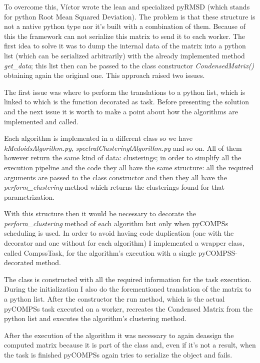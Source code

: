 To overcome this, Víctor wrote the lean and specialized pyRMSD (which stands for python Root Mean Squared Deviation). The problem is that these structure is not a native python type nor it's built with a combination of them. Because of this the framework can not serialize this matrix to send it to each worker. The first idea to solve it was to dump the internal data of the matrix into a python list (which can be serialized arbitrarily) with the already implemented method \textit{get\_data}; this list then can be passed to the class constructor \textit{CondensedMatrix()} obtaining again the original one. This approach raised two issues. 

The first issue was where to perform the translations to a python list, which is linked to which is the function decorated as task. Before presenting the solution and the next issue it is worth to make a point about how the algorithms are implemented and called. 

Each algorithm is implemented in a different class so we have \textit{kMedoidsAlgorithm.py}, \textit{spectralClusteringlAlgorithm.py} and so on. All of them however return the same kind of data: clusterings; in order to simplify all the execution pipeline and the code they all have the same structure: all the required arguments are passed to the class constructor and then they all have the \textit{perform\_clustering} method which returns the clusterings found for that parametrization. 

With this structure then it would be necessary to decorate the \textit{perform\_clustering} method of each algorithm but only when pyCOMPSs scheduling is used. In order to avoid having code duplication (one with the decorator and one without for each algorithm) I implemented a wrapper class, called CompssTask, for the algorithm's execution with a single pyCOMPSS-decorated method.

The class is constructed with all the required information for the task execution. During the initialization I also do the forementioned translation of the matrix to a python list. After the constructor the run method, which is the actual pyCOMPSs task executed on a worker, recreates the Condensed Matrix from the python list and executes the algorithm's clustering method. 

After the execution of the algorithm it was necessary to again deassign the computed matrix because it is part of the class and, even if it's not a result, when the task is finished pyCOMPSs again tries to serialize the object and fails.

